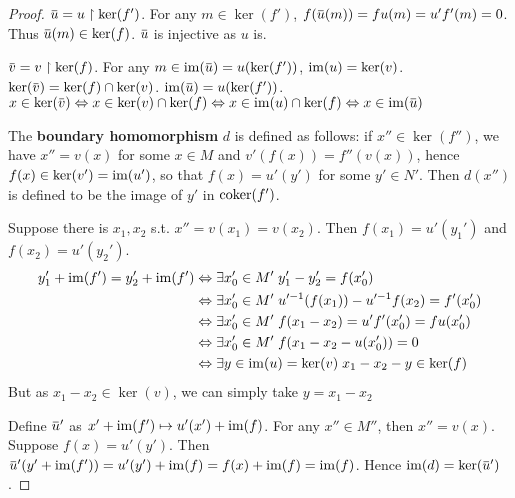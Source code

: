 \documentclass[11pt]{article}
\begin{document}
\begin{proof}
\(\baru=u\upharpoonright\ker(f')\). For any \(m\in\ker(f')\), \(f(\baru(m))=fu(m)=u'f'(m)=0\). Thus \(\baru(m)\in\ker(f)\). \(\baru\) is injective as \(u\) is.

\(\barv=v\upharpoonright\ker(f)\). For
any
\(m\in\im(\baru)=u(\ker(f'))\),
\(\operatorname{im}(u)=\ker(v)\). \(\ker(\barv)=\ker(f)\cap\ker(v)\). \(\im(\baru)=u(\ker(f'))\).
\(x\in\ker(\barv)\Leftrightarrow x\in\ker(v)\cap\ker(f)\Leftrightarrow x\in\im(u)\cap\ker(f)\Leftrightarrow x\in\im(\baru)\)

The \textbf{boundary homomorphism} \(d\) is defined as follows: if \(x''\in\ker(f'')\), we
have \(x''=v(x)\) for some \(x\in M\) and \(v'(f(x))=f''(v(x))\),
hence \(f(x)\in\ker(v') =\operatorname{im}(u')\), so that \(f(x)=u'(y')\) for some \(y'\in N'\).  Then \(d(x'')\)
is defined to be the image of \(y'\) in \(\operatorname{coker}(f')\).

Suppose there is \(x_1,x_2\) s.t. \(x''=v(x_1)=v(x_2)\). Then \(f(x_1)=u'(y_1')\)
and \(f(x_2)=u'(y_2')\).
\begin{align*}
y_1'+\operatorname{im}(f')=y_2' +\operatorname{im}(f')&\Leftrightarrow\exists x_0'\in M'\; y_1'-y_2'=f(x_0')\\&\Leftrightarrow\exists x_0'\in M'\; u'^{-1}(f(x_1))-u'^{-1}f(x_2)=f'(x_0')
\\&\Leftrightarrow\exists x_0'\in M'\; f(x_1-x_2)=u'f'(x_0')=fu(x_0')\\&\Leftrightarrow\exists x_0'\in M'\; f(x_1-x_2-u(x_0'))=0
\\&\Leftrightarrow\exists y\in\operatorname{im}(u)=\ker(v)\;x_1-x_2-y\in\ker(f)
\end{align*}
But as \(x_1-x_2\in\ker(v)\), we can simply take \(y=x_1-x_2\)

Define \(\baru'\) as \(x'+\operatorname{im}(f')\mapsto u'(x')+ \operatorname{im}(f)\). For any \(x''\in M''\), then \(x''=v(x)\).
Suppose \(f(x)=u'(y')\). Then \(\baru'(y'+\im(f'))=u'(y')+\im(f)=f(x)+\im(f) =\im(f)\).
Hence \(\im(d) =\ker(\baru')\).
\end{proof}
\end{document}
